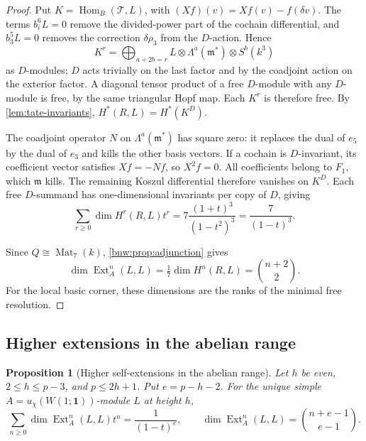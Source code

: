 \documentclass[11pt,reqno]{amsart}
\newtheorem{proposition}[proposition]{Proposition}
\theoremstyle{definition}
\theoremstyle{remark}
\theoremstyle{definition}
\newcommand{\Mat}{\operatorname{Mat}}
\newcommand{\Hom}{\operatorname{Hom}}
\newcommand{\Ext}{\operatorname{Ext}}
\begin{document}
\begin{proof}
Put $K=\Hom_B(\mathcal T,L)$, with
$(Xf)(v)=Xf(v)-f(\delta v)$. The terms $b_i^6L=0$ remove the
 divided-power part of the cochain differential, and $b_3^5L=0$
removes the correction $\delta\rho_3$ from the $D$-action. Hence
\[
 K^r=\bigoplus_{a+2b=r}
 L\otimes\Lambda^a(\mathfrak m^*)\otimes S^b(k^3)
\]
as $D$-modules; $D$ acts trivially on the last factor and by the
coadjoint action on the exterior factor. A diagonal tensor product
of a free $D$-module with any $D$-module is free, by the same triangular
Hopf map. Each $K^r$ is therefore free. By \cref{lem:tate-invariants},
$H^*(R,L)=H^*(K^D)$.

The coadjoint operator $N$ on $\Lambda^a(\mathfrak m^*)$ has square
zero: it replaces the dual of $e_5$ by the dual of $e_3$ and kills
 the other basis vectors. If a cochain is $D$-invariant, its coefficient
vector satisfies $Xf=-Nf$, so $X^2f=0$. All coefficients belong to
$F_1$, which $\mathfrak m$ kills. The remaining Koszul differential
therefore vanishes on $K^D$. Each free $D$-summand has one-dimensional
invariants per copy of $D$, giving
\[
 \sum_{r\ge0}\dim H^r(R,L)t^r
 =7\frac{(1+t)^3}{(1-t^2)^3}=\frac7{(1-t)^3}.
\]

Since $Q\cong\Mat_7(k)$, \cref{bnw:prop:adjunction} gives
\[
 \dim\Ext_A^n(L,L)=\tfrac17\dim H^n(R,L)=\binom{n+2}{2}.
\]
For the local basic corner, these dimensions are the ranks of the
minimal free resolution.
\end{proof}


\subsection{Higher extensions in the abelian range}

\begin{proposition}[Higher self-extensions in the abelian range]
\label{prop:w11-abelian-all-ext}
Let $h$ be even, $2\le h\le p-3$, and $p\le2h+1$.
Put $e=p-h-2$. For the unique simple
$A=u_\chi(W(1;\mathbf1))$-module $L$ at height $h$,
\[
 \sum_{n\ge0}\dim\Ext_A^n(L,L)t^n=\frac1{(1-t)^e},\qquad
 \dim\Ext_A^n(L,L)=\binom{n+e-1}{e-1}.
\]
\end{proposition}
\end{document}
